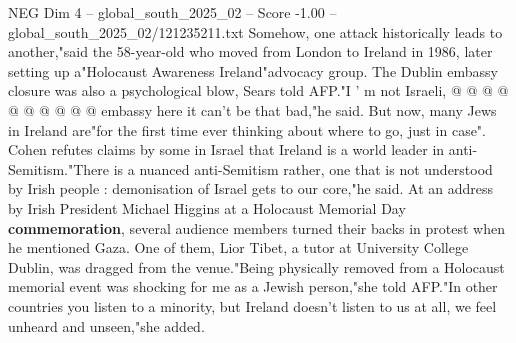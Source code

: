 \begin{textsample}{NEG Dim 4 – global\_south\_2025\_02 – Score -1.00 – global\_south\_2025\_02/121235211.txt}
Somehow, one attack historically leads to another,"said the 58-year-old who moved from London to Ireland in 1986, later setting up a"Holocaust Awareness Ireland"advocacy group.
The Dublin embassy closure was also a psychological blow, Sears told AFP."I ' m not Israeli, @ @ @ @ @ @ @ @ @ @ embassy here it can't be that bad,"he said.
But now, many Jews in Ireland are"for the first time ever thinking about where to go, just in case".
Cohen refutes claims by some in Israel that Ireland is a world leader in anti-Semitism."There is a nuanced anti-Semitism rather, one that is not understood by Irish people : demonisation of Israel gets to our core,"he said.
At an address by Irish President Michael Higgins at a Holocaust Memorial Day \textbf{commemoration}, several audience members turned their backs in protest when he mentioned Gaza.
One of them, Lior Tibet, a tutor at University College Dublin, was dragged from the venue."Being physically removed from a Holocaust memorial event was shocking for me as a Jewish person,"she told AFP."In other countries you listen to a minority, but Ireland doesn't listen to us at all, we feel unheard and unseen,"she added.

\end{textsample}
